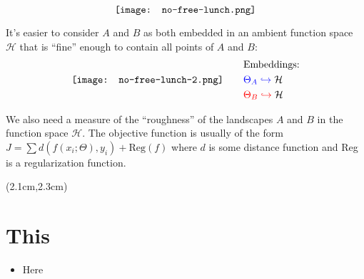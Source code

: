 \begin{preview}
\begin{minipage}{\textwidth}
\begin{equation}
\vcenter{\hbox{\texttt{[image: no-free-lunch.png]}}}
\end{equation}

It's easier to consider $A$ and $B$ as both embedded in an ambient function space $\mathcal{H}$ that is ``fine'' enough to contain all points of $A$ and $B$:
\begin{equation}
\vcenter{\hbox{\texttt{[image: no-free-lunch-2.png]}}} \qquad
\begin{aligned}
& \text{Embeddings:} \\
& {\color{blue}\Theta_A \hookrightarrow} \; \mathcal{H} \\
& {\color{red}\Theta_B \hookrightarrow} \; \mathcal{H} 
\end{aligned}
\end{equation}

We also need a measure of the ``roughness'' of the landscapes $A$ and $B$ in the function space $\mathcal{H}$.  The objective function is usually of the form $ J = \sum d( f(x_i; \Theta) , y_i ) + \text{Reg}(f)$ where $d$ is some distance function and Reg is a regularization function.





\end{minipage}
\end{preview}

\begin{preview}
\begin{textblock*}{5cm}(2.1cm,2.3cm) %
	{\color{red}{\large \textcircled{\small \themypage}}}
	\addtocounter{mypage}{1}
\end{textblock*}

\begin{minipage}{\textwidth}
	\setlength{\parskip}{0.4\baselineskip}

\section{This}

\begin{itemize}
	\item Here
\end{itemize}

\end{minipage}
\end{preview}


